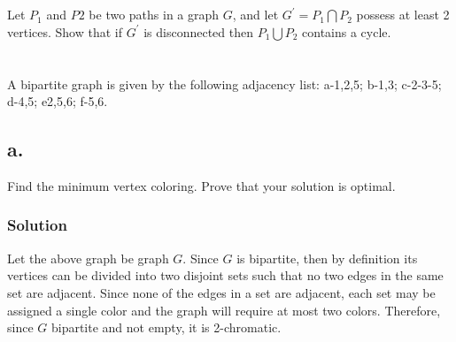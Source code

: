 \documentclass{amsart}
\begin{document}
\section{}

Let $P_1$ and $P2$ be two paths in a graph $G$, and let $G^\prime=P_1 \bigcap P_2$ possess at least 2
vertices.
Show that if $G^\prime$ is disconnected then $P_1\bigcup P_2$ contains a cycle.

\section{}
A bipartite graph is given by the following adjacency list: a-1,2,5; b-1,3; c-2-3-5; d-4,5; e2,5,6; f-5,6.

\begin{figure}[h]
\end{figure}
\subsection*{a.}
Find the minimum vertex coloring. Prove that your solution is optimal.
\subsubsection*{Solution}
Let the above graph be graph $G$.
Since $G$ is bipartite, then by definition its vertices can be divided into two
disjoint sets such that no two edges in the same set are adjacent.
Since none of the edges in a set are adjacent, each set may be assigned a single
color and the graph will require at most two colors.
Therefore, since $G$ bipartite and not empty, it is 2-chromatic.
\begin{figure}[h]
\end{figure}
\end{document}
